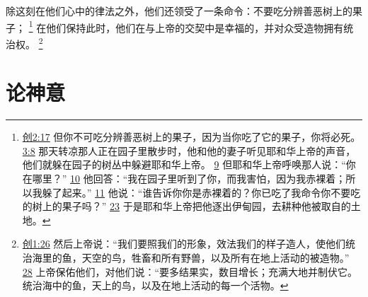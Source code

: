 \documentclass[12pt, a4paper, oneside]{ctexart}
\begin{document}
	除这刻在他们心中的律法之外，他们还领受了一条命令：不要吃分辨善恶树上的果子；
	\footnote {
		\href{https://biblehub.com/genesis/2-17.htm}{创2:17} 但你不可吃分辨善恶树上的果子，因为当你吃了它的果子，你将必死。
		\href{https://biblehub.com/genesis/3-8.htm}{3:8} 那天转凉那人正在园子里散步时，他和他的妻子听见耶和华上帝的声音，他们就躲在园子的树丛中躲避耶和华上帝。
		\href{https://biblehub.com/genesis/3-9.htm}{9} 但耶和华上帝呼唤那人说：“你在哪里？”
		\href{https://biblehub.com/genesis/3-10.htm}{10} 他回答：“我在园子里听到了你，而我害怕，因为我赤裸着；所以我躲了起来。”
		\href{https://biblehub.com/genesis/3-11.htm}{11} 他说：“谁告诉你你是赤裸着的？你已吃了我命令你不要吃的树上的果子吗？”
		\href{https://biblehub.com/genesis/3-23.htm}{23} 于是耶和华上帝把他逐出伊甸园，去耕种他被取自的土地。
	}
	在他们保持此时，他们在与上帝的交契中是幸福的，并对众受造物拥有统治权。
	\footnote {
		\href{https://biblehub.com/genesis/1-26.htm}{创1:26} 然后上帝说：“我们要照我们的形象，效法我们的样子造人，使他们统治海里的鱼，天空的鸟，牲畜和所有野兽，以及所有在地上活动的被造物。”
		\href{https://biblehub.com/genesis/1-28.htm}{28} 上帝保佑他们，对他们说：“要多结果实，数目增长；充满大地并制伏它。统治海中的鱼，天上的鸟，以及在地上活动的每一个活物。
	}

\section{论神意}
\end{document}
